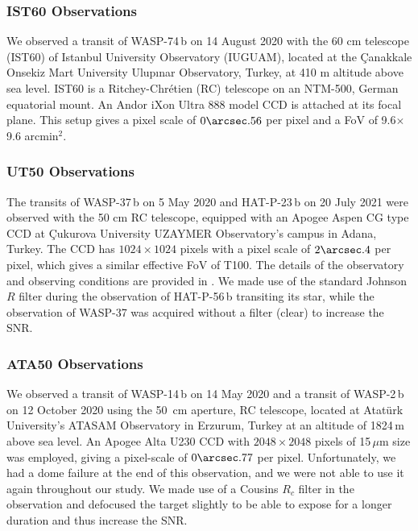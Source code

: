 \documentclass[a4paper,fleqn,usenatbib]{mnras}
\begin{document}
\subsubsection{IST60 Observations}
We observed a transit of WASP-74\,b on 14 August 2020 with the 60 cm telescope (IST60) of Istanbul University Observatory (IUGUAM), located at the \c{C}anakkale Onsekiz Mart University Ulup{\i}nar Observatory, Turkey, at 410 m altitude above sea level. IST60 is a Ritchey-Chr\'etien (RC) telescope on an NTM-500, German equatorial mount. An Andor iXon Ultra 888 model CCD is attached at its focal plane. This setup gives a pixel scale of $0\arcsec.56$ per pixel and a FoV of 9.6$\times$9.6 arcmin$^2$.

\subsubsection{UT50 Observations}
The transits of WASP-37\,b on 5 May 2020 and HAT-P-23\,b on 20 July 2021 were observed with the 50 cm RC telescope, equipped with an Apogee Aspen CG type CCD at \c{C}ukurova University UZAYMER Observatory's campus in Adana, Turkey. The CCD has $1024\times1024$ pixels with a pixel scale of $2\arcsec.4$ per pixel, which gives a similar effective FoV of T100. The details of the observatory and observing conditions are provided in \cite{2020arXiv200600528P}. We made use of the standard Johnson $R$ filter during the observation of HAT-P-56\,b transiting its star, while the observation of WASP-37 was acquired without a filter (clear) to increase the SNR.

\subsubsection{ATA50 Observations}
We observed a transit of WASP-14\,b on 14 May 2020 and a transit of WASP-2\,b on 12 October 2020 using the 50~cm aperture, RC telescope, located at Atat\"urk University's ATASAM Observatory in Erzurum, Turkey at an altitude of 1824\,m above sea level. An Apogee Alta U230 CCD with $2048\times2048$ pixels of 15\,$\mu$m size was employed, giving a pixel-scale of $0\arcsec.77$ per pixel. Unfortunately, we had a dome failure at the end of this observation, and we were not able to use it again throughout our study. We made use of a Cousins $R_c$ filter in the observation and defocused the target slightly to be able to expose for a longer duration and thus increase the SNR. 
\end{document}
